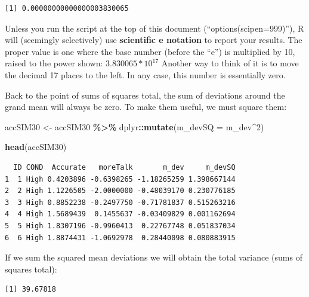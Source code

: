 \documentclass[
  11pt,
]{book}
\newenvironment{Shaded}{\begin{snugshade}}{\end{snugshade}}
\newcommand{\AttributeTok}[1]{\textcolor[rgb]{0.27,0.27,0.27}{#1}}
\newcommand{\DecValTok}[1]{\textcolor[rgb]{0.06,0.06,0.06}{#1}}
\newcommand{\FunctionTok}[1]{\textcolor[rgb]{0.27,0.27,0.27}{\textbf{#1}}}
\newcommand{\NormalTok}[1]{#1}
\newcommand{\OtherTok}[1]{\textcolor[rgb]{0.37,0.37,0.37}{#1}}
\newcommand{\SpecialCharTok}[1]{\textcolor[rgb]{0.43,0.43,0.43}{\textbf{#1}}}
\begin{document}
\begin{verbatim}
[1] 0.00000000000000003830065
\end{verbatim}

Unless you run the script at the top of this document (``options(scipen=999)''), R will (seemingly selectively) use \textbf{scientific e notation} to report your results. The proper value is one where the base number (before the ``e'') is multiplied by 10, raised to the power shown: \(3.830065 * 10^{17}\) Another way to think of it is to move the decimal 17 places to the left. In any case, this number is essentially zero.

Back to the point of sums of squares total, the sum of deviations around the grand mean will always be zero. To make them useful, we must square them:

\begin{Shaded}
\begin{Highlighting}[]
\NormalTok{accSIM30 }\OtherTok{\textless{}{-}}\NormalTok{ accSIM30 }\SpecialCharTok{\%\textgreater{}\%} 
\NormalTok{  dplyr}\SpecialCharTok{::}\FunctionTok{mutate}\NormalTok{(}\AttributeTok{m\_devSQ =}\NormalTok{ m\_dev}\SpecialCharTok{\^{}}\DecValTok{2}\NormalTok{)}

\FunctionTok{head}\NormalTok{(accSIM30)}
\end{Highlighting}
\end{Shaded}

\begin{verbatim}
  ID COND  Accurate   moreTalk       m_dev     m_devSQ
1  1 High 0.4203896 -0.6398265 -1.18265259 1.398667144
2  2 High 1.1226505 -2.0000000 -0.48039170 0.230776185
3  3 High 0.8852238 -0.2497750 -0.71781837 0.515263216
4  4 High 1.5689439  0.1455637 -0.03409829 0.001162694
5  5 High 1.8307196 -0.9960413  0.22767748 0.051837034
6  6 High 1.8874431 -1.0692978  0.28440098 0.080883915
\end{verbatim}

If we sum the squared mean deviations we will obtain the total variance (sums of squares total):

\begin{Shaded}
\end{Shaded}

\begin{verbatim}
[1] 39.67818
\end{verbatim}
\end{document}
